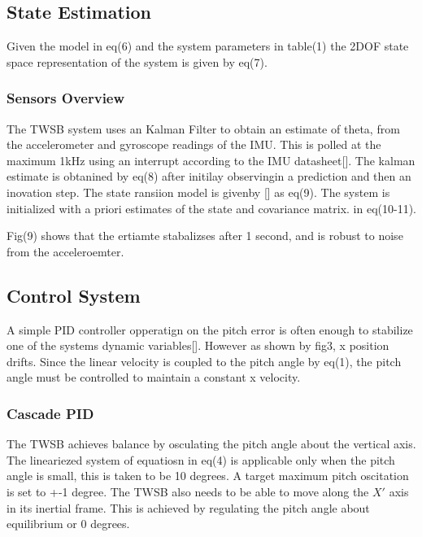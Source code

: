     \subsection{State Estimation}
        Given the model in eq(6) and the system parameters in table(1) the 2DOF 
        state space representation of the system is given by eq(7).
        \subsubsection{Sensors Overview}
        The TWSB system uses an Kalman Filter to obtain an estimate of theta, 
        from the accelerometer and gyroscope readings of the IMU. 
        This is polled at the maximum 1kHz using an interrupt according to the IMU datasheet[]. 
        The kalman estimate is obtanined by eq(8)  after initilay observingin
         a prediction and then an inovation step.
        The state ransiion model is givenby [] as eq(9).  The system is initialized with a 
        priori estimates of the state and covariance matrix. in eq(10-11). 

        Fig(9) shows that the ertiamte stabalizses after 1 second, 
        and is robust to noise from the acceleroemter. 
        \pagebreak{}
    \subsection{Control System}
       
        A simple PID controller opperatign on the pitch error is often enough to stabilize one of the systems dynamic variables[].
        However as shown by fig3, x position drifts. Since the linear velocity is coupled to the
        pitch angle by eq(1), the pitch angle must be controlled to maintain a constant x velocity. 

        \subsubsection{Cascade PID}

        The TWSB achieves balance by osculating the pitch angle about the vertical axis. 
        The lineariezed system of equatiosn in eq(4) is applicable 
        only when the pitch angle is small, this is taken to be 10 degrees. 
        A target maximum pitch oscitation is set to +-1 degree. 
        The TWSB also needs to be able to move along the $X'$ axis in its inertial frame.
        This is achieved by regulating the pitch angle about equilibrium or 0 degrees.

